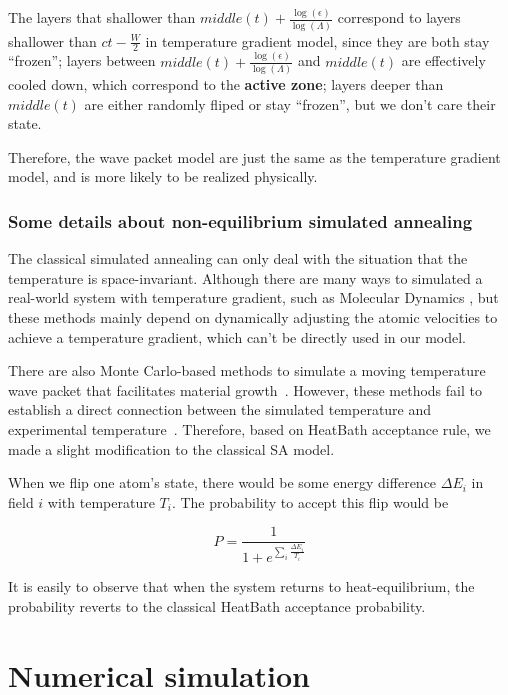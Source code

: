\documentclass[twocolumn,superscriptaddress,english,showpacs,longbibliography]{revtex4-2}
\begin{document}
The layers that shallower than
$middle(t) + \frac{\log(\epsilon)}{\log(\Lambda)}$ correspond to
layers shallower than $ct-\frac{W}{2}$ in temperature gradient model,
since they are both stay ``frozen''; layers between
$middle(t) +\frac{\log(\epsilon)}{\log(\Lambda)}$ and $middle(t)$
are effectively cooled down, which correspond to the \textbf{active
zone}; layers deeper than $middle(t)$ are either randomly fliped or
stay ``frozen'', but we don't care their state.

Therefore, the wave packet model are just the same as the temperature
gradient model, and is more likely to be realized physically.

\subsubsection{Some details about non-equilibrium simulated
annealing}\label{some-details-about-non-equilibrium-simulated-annealing}

The classical simulated annealing can only deal with the situation that
the temperature is space-invariant. Although there are many ways to
simulated a real-world system with temperature gradient, such as
Molecular Dynamics \cite{Bai2015, Deng2006}, but
these methods mainly depend on dynamically adjusting the atomic
velocities to achieve a temperature gradient, which can't be directly
used in our model.

There are also Monte Carlo-based methods to simulate a moving
temperature wave packet that facilitates material growth~\cite{Godfrey1995, Tan2017}.
However, these methods fail to establish a direct connection between the simulated temperature and experimental
temperature~\cite{Zollner2014}.
Therefore, based on HeatBath acceptance rule, we made a slight modification to the classical SA model.

When we flip one atom's state, there would be some energy difference
$\Delta E_{i}$ in field $i$ with temperature $T_i$. The
probability to accept this flip would be

\begin{equation}
P = \frac{1}{1 + e^{\sum_i \frac{\Delta E_i}{T_i}}}
\end{equation}

It is easily to observe that when the system returns to
heat-equilibrium, the probability reverts to the classical HeatBath
acceptance probability.
\section{Numerical simulation}\label{sec:numerical-result}
\end{document}
